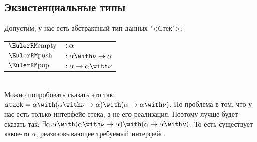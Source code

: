 \subsection*{\texorpdfstring{Экзистенциальные типы}{Existential types}}

\todo
Допустим, у нас есть абстрактный тип данных "<Стек">: \\
\begin{tabular}{l l}
    $\comb{empty}$ & $: \alpha$ \\
    $\comb{push}$  & $: \alpha\with\nu\to\alpha$ \\
    $\comb{pop}$   & $: \alpha\to\alpha\with\nu$ \\
\end{tabular} \\
Можно попробовать сказать это так: $\mathtt{stack} =
    \alpha \with (\alpha\with\nu\to\alpha) \with (\alpha\to\alpha\with\nu)$.
Но проблема в том, что у нас есть только интерфейс стека, а не его реализация. Поэтому лучше будет сказать так:
    $\exists \alpha . \alpha \with (\alpha\with\nu\to\alpha) \with (\alpha\to\alpha\with\nu)$.
То есть существует какое-то $\alpha$, реазизовывающее требуемый интерфейс.
\todo 

\ 

